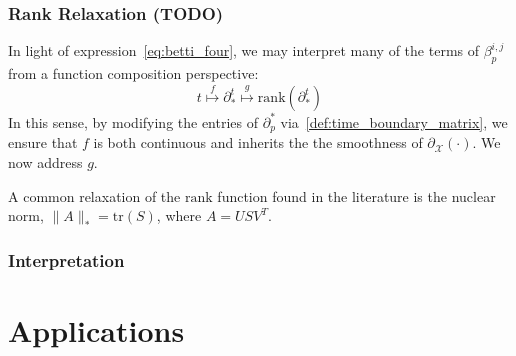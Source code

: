 \documentclass[10pt]{article}
\begin{document}


\subsubsection*{Rank Relaxation (TODO)}
In light of expression~\eqref{eq:betti_four}, we may interpret many of the terms of $\beta_p^{i,j}$ from a function composition perspective: 
$$ t \stackrel{f}{\mapsto} \partial_\ast^t \stackrel{g}{\mapsto} \mathrm{rank}(\partial_\ast^t ) $$
In this sense, by modifying the entries of $\partial_p^\ast$ via~\ref{def:time_boundary_matrix}, we ensure that $f$ is both continuous and inherits the the smoothness of $\partial_\mathcal{X}(\cdot)$. We now address $g$.

A common relaxation of the $\mathrm{rank}$ function found in the literature is the nuclear norm, $\lVert A \rVert_\ast = \mathrm{tr}(S)$, where $A = U S V^T$. 


\subsubsection*{Interpretation}


\section{Applications}



% 
\end{document}
